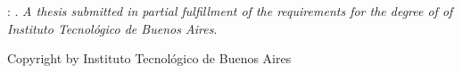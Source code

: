 \vspace*{0.8\textheight}
\noindent \@author: \@engtitle. \textit{A thesis submitted in partial fulfillment of the requirements for the degree of \textbf{\@degree} of  Instituto Tecnológico de Buenos Aires}.
\par
\vspace{1\baselineskip}
\noindent Copyright \textcopyright\space\@copyrightYear\space by Instituto Tecnológico de Buenos Aires